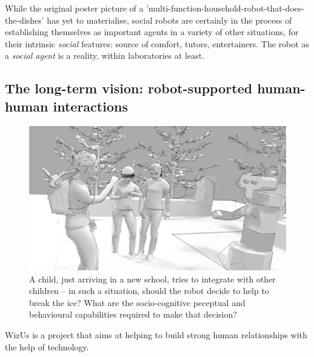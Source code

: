 \documentclass[11pt,a4paper]{report}
\newcommand{\project}{WizUs\xspace}
\newcommand{\eu}[1]{}
\begin{document}
\eu{(B2.a and B2.b: max 15 pages)}
\eu{Specify the proposal objectives in the context of the state
of the art in the research field. It should be clear how and why the proposed work is important for
the field, and what impact it will have if successful, such as how it may open up new horizons or
opportunities for science, technology or scholarship. Specify any particularly challenging or
unconventional aspects of the proposal, including multi- or inter-disciplinary aspects.}


While the original poster picture of a
'multi-function-household-robot-that-does-the-dishes' has yet to materialise,
social robots are certainly in the process of establishing themselves as
important agents in a variety of other situations, for their intrinsic
\emph{social} features: source of comfort, tutors, entertainers. The robot as a
\emph{social agent} is a reality, within laboratories at least.

\subsection{The long-term vision: robot-supported human-human interactions}


\begin{figure}
\centering
\includegraphics[width=0.9\linewidth]{figs/rHHI-1}
\caption{A child, just arriving in a new school, tries to integrate with other
    children -- in such a situation, should the robot decide to help to break the ice? What
    are the socio-cognitive peceptual and behavioural capabilities required to
    make that decision?}
\label{fig:rHHI}
\end{figure}


\project is a project that aims at helping to build strong human
relationships with the help of technology.
\end{document}
